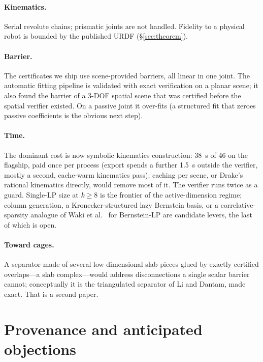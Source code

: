 \documentclass[10pt,twocolumn,letterpaper]{article}
\begin{document}
\paragraph{Kinematics.} Serial revolute chains; prismatic joints are not handled. Fidelity to a physical robot is bounded by the published URDF (\S\ref{sec:theorem}).

\paragraph{Barrier.} The certificates we ship use scene-provided barriers, all linear in one joint. The automatic fitting pipeline is validated with exact verification on a planar scene; it also found the barrier of a 3-DOF spatial scene that was certified before the spatial verifier existed. On a passive joint it over-fits (a structured fit that zeroes passive coefficients is the obvious next step).

\paragraph{Time.} The dominant cost is now symbolic kinematics construction: 38~s of 46 on the flagship, paid once per process (export spends a further 1.5~s outside the verifier, mostly a second, cache-warm kinematics pass); caching per scene, or Drake's rational kinematics directly, would remove most of it. The verifier runs twice as a guard. Single-LP size at $k\ge8$ is the frontier of the active-dimension regime; column generation, a Kronecker-structured lazy Bernstein basis, or a correlative-sparsity analogue of Waki et al.~\cite{waki2006} for Bernstein-LP are candidate levers, the last of which is open.

\paragraph{Toward cages.} A separator made of several low-dimensional slab pieces glued by exactly certified overlaps---a slab complex---would address disconnections a single scalar barrier cannot; conceptually it is the triangulated separator of Li and Dantam, made exact. That is a second paper.

\section{Provenance and anticipated objections}\label{sec:reviewers}
\end{document}
